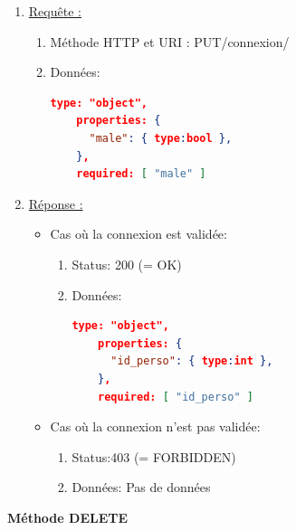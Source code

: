 \documentclass[11pt, a4paper]{article}
\begin{document}
  \begin{enumerate}
   \item \underline{Requête :}
    \begin{enumerate}
     \item Méthode HTTP et URI : PUT/connexion/
     \item Données:
	\begin{lstlisting}[language=JSON]
	type: "object",
	properties: {
	  "male": { type:bool },
	},
	required: [ "male" ]
	\end{lstlisting}
	     
    \end{enumerate}

   \item \underline{Réponse :}
   \begin{itemize}
    \item Cas où la connexion est validée:
    \begin{enumerate}
     \item Status: 200 (= OK)
     \item Données:
	\begin{lstlisting}[language=JSON]
	type: "object",
	properties: {
	  "id_perso": { type:int },
	},
	required: [ "id_perso" ]
	\end{lstlisting} 
    \end{enumerate}

    \item Cas où la connexion n'est pas validée:
    \begin{enumerate}
     \item Status:403 (= FORBIDDEN)
     \item Données: Pas de données\\
    \end{enumerate}
    
   \end{itemize}

  \end{enumerate}
  
  \textbf{Méthode DELETE}
  
\end{document}
